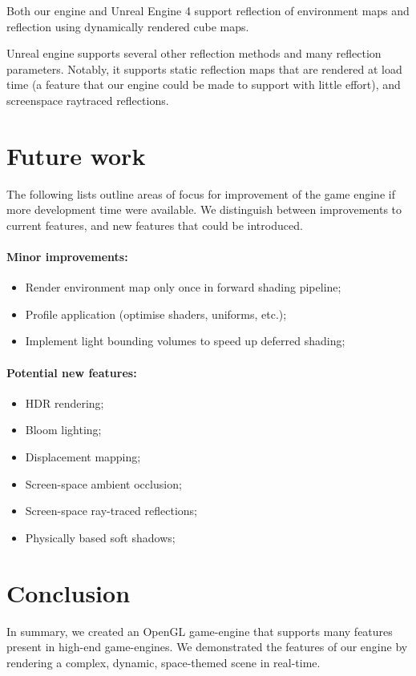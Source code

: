 \documentclass[11pt]{scrartcl} %
\begin{document}
        Both our engine and Unreal Engine 4 support reflection of environment
        maps and reflection using dynamically rendered cube maps.

        Unreal engine supports several other reflection methods and many
        reflection parameters. Notably, it supports static reflection maps that
        are rendered at load time (a feature that our engine could be made to
        support with little effort), and screenspace raytraced reflections.

\section{Future work}

    The following lists outline areas of focus for improvement of the game
    engine if more development time were available. We distinguish between
    improvements to current features, and new features that could be
    introduced.

    \paragraph{Minor improvements:}
    \begin{itemize}
        \item Render environment map only once in forward shading pipeline;
        \item Profile application (optimise shaders, uniforms, etc.);
        \item Implement light bounding volumes to speed up deferred shading;
    \end{itemize}

    \paragraph{Potential new features:}
    \begin{itemize}
        \item HDR rendering;
        \item Bloom lighting;
        \item Displacement mapping;
        \item Screen-space ambient occlusion;
        \item Screen-space ray-traced reflections;
        \item Physically based soft shadows;
    \end{itemize}


\section{Conclusion}

    In summary, we created an OpenGL game-engine that supports many features
    present in high-end game-engines. We demonstrated the features of our
    engine by rendering a complex, dynamic, space-themed scene in real-time.
\end{document}
